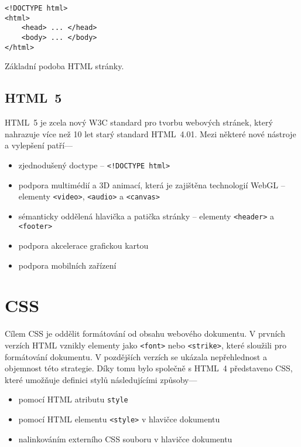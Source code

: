 
\begin{example}
    \centering
    \begin{lstlisting}
<!DOCTYPE html>
<html>
    <head> ... </head>
    <body> ... </body>
</html>
    \end{lstlisting}
    \caption{Základní podoba HTML stránky.}
    \label{example:html}
\end{example}

\subsection{HTML~5}

HTML~5 je zcela nový W3C standard pro tvorbu webových stránek, který nahrazuje více než 10 let starý standard HTML~4.01. Mezi některé nové nástroje a vylepšení patří---

\begin{itemize}
    \item zjednodušený doctype -- \texttt{<!DOCTYPE html>}
    \item podpora multimédií a 3D animací, která je zajištěna technologií WebGL -- elementy \texttt{<video>}, \texttt{<audio>} a \texttt{<canvas>}
    \item sémanticky oddělená hlavička a patička stránky -- elementy \texttt{<header>} a \texttt{<footer>}
    \item podpora akcelerace grafickou kartou
    \item podpora mobilních zařízení
\end{itemize}

\section{CSS}
\label{sec:css}

Cílem CSS je oddělit formátování od obsahu webového dokumentu. V prvních verzích HTML vznikly elementy jako \texttt{<font>} nebo \texttt{<strike>}, které sloužili pro formátování dokumentu. V pozdějších verzích se ukázala nepřehlednost a objemnost této strategie. Díky tomu bylo společně s HTML~4 představeno CSS, které umožňuje definici stylů následujícími způsoby---

\begin{itemize}
    \item pomocí HTML atributu \texttt{style}
    \item pomocí HTML elementu \texttt{<style>} v hlavičce dokumentu
    \item nalinkováním externího CSS souboru v hlavičce dokumentu
\end{itemize}

